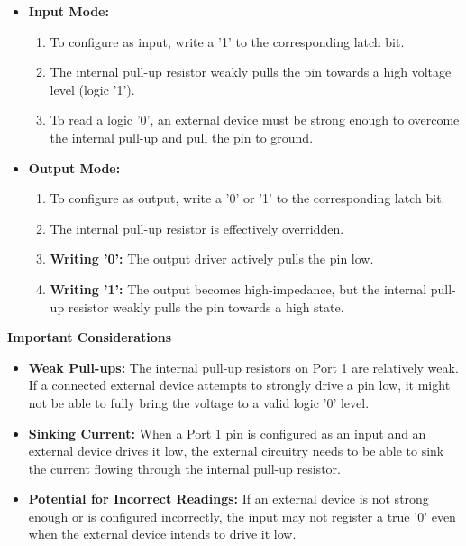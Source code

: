 \documentclass[
]{article}
\begin{document}
\begin{itemize}
\item
  \textbf{Input Mode:}

  \begin{enumerate}
  \def\labelenumi{\arabic{enumi}.}
  \item
    To configure as input, write a '1' to the corresponding latch bit.
  \item
    The internal pull-up resistor weakly pulls the pin towards a high
    voltage level (logic '1').
  \item
    To read a logic '0', an external device must be strong enough to
    overcome the internal pull-up and pull the pin to ground.
  \end{enumerate}
\item
  \textbf{Output Mode:}

  \begin{enumerate}
  \def\labelenumi{\arabic{enumi}.}
  \item
    To configure as output, write a '0' or '1' to the corresponding
    latch bit.
  \item
    The internal pull-up resistor is effectively overridden.
  \item
    \textbf{Writing '0':} The output driver actively pulls the pin low.
  \item
    \textbf{Writing '1':} The output becomes high-impedance, but the
    internal pull-up resistor weakly pulls the pin towards a high state.
  \end{enumerate}
\end{itemize}

\textbf{Important Considerations}

\begin{itemize}
\item
  \textbf{Weak Pull-ups:} The internal pull-up resistors on Port 1 are
  relatively weak. If a connected external device attempts to strongly
  drive a pin low, it might not be able to fully bring the voltage to a
  valid logic '0' level.
\item
  \textbf{Sinking Current:} When a Port 1 pin is configured as an input
  and an external device drives it low, the external circuitry needs to
  be able to sink the current flowing through the internal pull-up
  resistor.
\item
  \textbf{Potential for Incorrect Readings:} If an external device is
  not strong enough or is configured incorrectly, the input may not
  register a true '0' even when the external device intends to drive it
  low.
\end{itemize}
\end{document}
